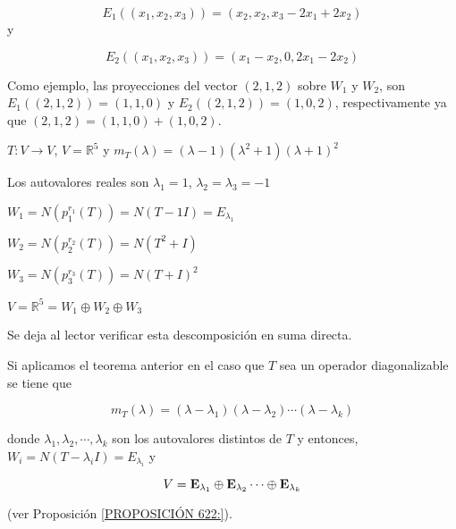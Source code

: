 \begin{example}
$$E_1((x_1,x_2,x_3))=  (x_2,x_2, x_3-2x_1+2x_2)$$
\noindent
y 

$$E_2((x_1,x_2,x_3))=  (x_1-x_2,0, 2x_1-2x_2)$$

\bigskip

\noindent
Como ejemplo, las proyecciones  del vector $(2,1,2)$  sobre $W_1$ y $W_2$, son $E_1((2,1,2)) =(1,1,0)$  y $E_2((2,1,2))=(1,0,2)$, respectivamente ya que  $(2,1,2)=  (1,1,0) +  (1,0,2)$.

\end{example}

\bigskip




\begin{example}

\bigskip

 $T: V \rightarrow V$,  $V=\mathbb{R}^{5}$  y   $m_T(\lambda)=  (\lambda-1)(\lambda^{2}+1) (\lambda+1)^{2}$

\bigskip

Los autovalores reales son $\lambda_1=1$, $\lambda_2=\lambda_3=-1$

\bigskip

$W_1=N(p_1^{r_1}(T))=N(T-1I)=E_{\lambda_1}$

\bigskip

$W_2=N(p_2^{r_2}(T))=N(T^2+I)$





\bigskip

$W_3=N(p_3^{r_3}(T))=N(T+I)^2$

\bigskip

 $V=\mathbb{R}^{5}=W_1 \oplus W_2 \oplus W_3$

 \bigskip

 Se deja al lector verificar esta descomposición en suma directa.

\end{example}

\bigskip

\begin{remark}  

Si aplicamos el teorema anterior en el caso que $T$ sea un operador diagonalizable se tiene que 


$$m_T(\lambda)=(\lambda-\lambda_1) (\lambda-\lambda_2)\cdots(\lambda-\lambda_k)$$

\noindent
 donde $\lambda_1,\lambda_2, \cdots,\lambda_k$ son los autovalores distintos de $T$ y entonces, $W_i=N(T-\lambda_i I )=E_{\lambda_i}$
y

$$V=\bold E_{\lambda_1} \oplus \bold E_{\lambda_2} \cdots  \oplus \bold E_{\lambda_k}$$

\bigskip


(ver Proposición \ref{PROPOSICIÓN 622:}).
\end{remark}


